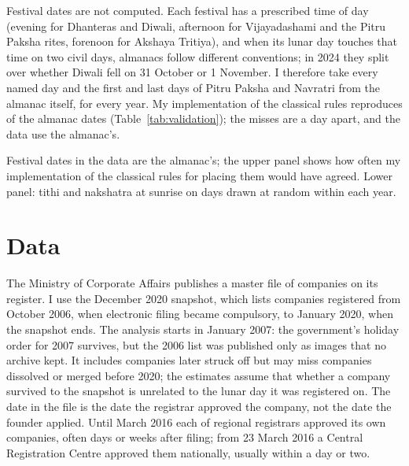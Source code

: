 \documentclass[12pt,letterpaper]{article}
\begin{document}
Festival dates are not computed. Each festival has a prescribed time of day (evening for Dhanteras and Diwali, afternoon for Vijayadashami and the Pitru Paksha rites, forenoon for Akshaya Tritiya), and when its lunar day touches that time on two civil days, almanacs follow different conventions; in 2024 they split over whether Diwali fell on 31 October or 1 November. I therefore take every named day and the first and last days of Pitru Paksha and Navratri from the almanac itself, for every year. My implementation of the classical rules reproduces \RuleAgree{} of the \RuleAgreeN{} almanac dates (Table~\ref{tab:validation}); the misses are a day apart, and the data use the almanac's.

\begin{table}[t]
\centering
\caption{Computed panchang against Drik Panchang (New Delhi): dates that agree exactly}
\label{tab:validation}
\small

\par\medskip
\begin{minipage}{0.85\textwidth}\footnotesize
Festival dates in the data are the almanac's; the upper panel shows how often my implementation of the classical rules for placing them would have agreed. Lower panel: tithi and nakshatra at sunrise on days drawn at random within each year.
\end{minipage}
\end{table}

\section{Data}

The Ministry of Corporate Affairs publishes a master file of companies on its register. I use the December 2020 snapshot, which lists \NCompanies{} companies registered from October 2006, when electronic filing became compulsory, to January 2020, when the snapshot ends. The analysis starts in January 2007: the government's holiday order for 2007 survives, but the 2006 list was published only as images that no archive kept. It includes companies later struck off but may miss companies dissolved or merged before 2020; the estimates assume that whether a company survived to the snapshot is unrelated to the lunar day it was registered on. The date in the file is the date the registrar approved the company, not the date the founder applied. Until March 2016 each of \NRocs{} regional registrars approved its own companies, often days or weeks after filing; from 23 March 2016 a Central Registration Centre approved them nationally, usually within a day or two.
\end{document}
